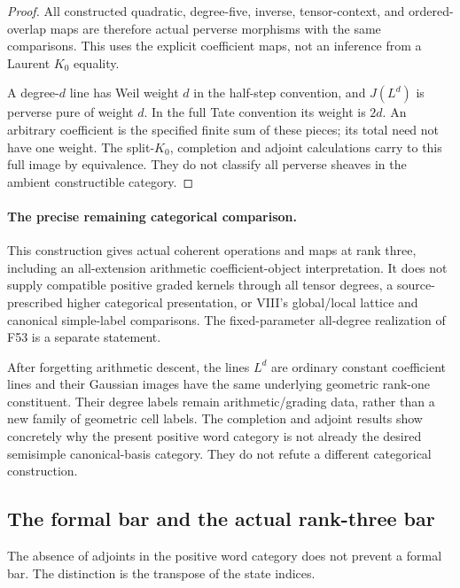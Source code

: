 \documentclass[11pt,a4paper]{article}
\newcommand{\fid}[1]{\textsf{#1}}\newcommand{\gate}[1]{\textsf{#1}}
\theoremstyle{named}\newtheorem{finding}{Finding}[section]
\theoremstyle{definition}\newtheorem{definition}[finding]{Definition}
\theoremstyle{remark}\newtheorem{remark}[finding]{Remark}
\begin{document}
\begin{proof}
All constructed quadratic, degree-five, inverse,
tensor-context, and ordered-overlap maps are therefore
actual perverse morphisms with the same comparisons.
This uses the explicit coefficient maps, not an
inference from a Laurent $K_0$ equality.

A degree-$d$ line has Weil weight $d$ in the half-step
convention, and $J(L^d)$ is perverse pure of weight $d$.
In the full Tate convention its weight is $2d$.
An arbitrary coefficient is the specified finite sum
of these pieces; its total need not have one weight.
The split-$K_0$, completion and adjoint calculations
carry to this full image by equivalence.
They do not classify all perverse sheaves in the
ambient constructible category.
\end{proof}

\paragraph{The precise remaining categorical comparison.}
This construction gives actual coherent operations and
maps at rank three, including an all-extension arithmetic
coefficient-object interpretation.
It does not supply compatible positive graded kernels
through all tensor degrees, a source-prescribed higher
categorical presentation, or VIII's global/local lattice and canonical
simple-label comparisons.
The fixed-parameter all-degree realization of \fid{F53}
is a separate statement.

After forgetting arithmetic descent, the lines $L^d$
are ordinary constant coefficient lines and their Gaussian
images have the same underlying geometric rank-one
constituent.
Their degree labels remain arithmetic/grading data,
rather than a new family of geometric cell labels.
The completion and adjoint results show concretely
why the present positive word category is not already
the desired semisimple canonical-basis category.
They do not refute a different categorical construction.

\subsection{The formal bar and the actual rank-three bar}
The absence of adjoints in the positive word category does not
prevent a formal bar. The distinction is the transpose of the
state indices.
\end{document}
